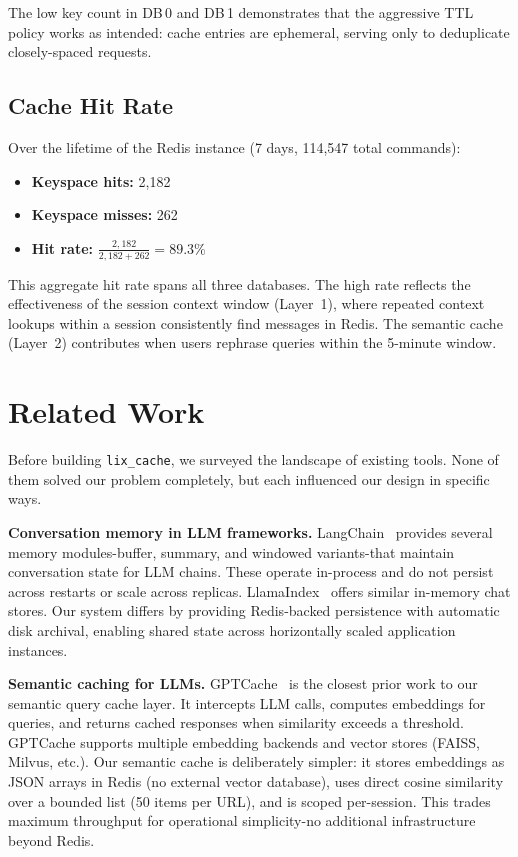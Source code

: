 \documentclass[conference]{IEEEtran}
\begin{document}
The low key count in DB\,0 and DB\,1 demonstrates that the aggressive TTL policy works as intended: cache entries are ephemeral, serving only to deduplicate closely-spaced requests.

\subsection{Cache Hit Rate}

Over the lifetime of the Redis instance (7 days, 114{,}547 total commands):

\begin{itemize}
\item \textbf{Keyspace hits:} 2{,}182
\item \textbf{Keyspace misses:} 262
\item \textbf{Hit rate:} $\frac{2{,}182}{2{,}182 + 262} = \mathbf{89.3\%}$
\end{itemize}

This aggregate hit rate spans all three databases. The high rate reflects the effectiveness of the session context window (Layer~1), where repeated context lookups within a session consistently find messages in Redis. The semantic cache (Layer~2) contributes when users rephrase queries within the 5-minute window.

\section{Related Work}
\label{sec:related}

Before building \texttt{lix\_cache}, we surveyed the landscape of existing tools. None of them solved our problem completely, but each influenced our design in specific ways.

\textbf{Conversation memory in LLM frameworks.}
LangChain~\cite{langchain2023} provides several memory modules-buffer, summary, and windowed variants-that maintain conversation state for LLM chains. These operate in-process and do not persist across restarts or scale across replicas. LlamaIndex~\cite{llamaindex2023} offers similar in-memory chat stores. Our system differs by providing Redis-backed persistence with automatic disk archival, enabling shared state across horizontally scaled application instances.

\textbf{Semantic caching for LLMs.}
GPTCache~\cite{gptcache2023} is the closest prior work to our semantic query cache layer. It intercepts LLM calls, computes embeddings for queries, and returns cached responses when similarity exceeds a threshold. GPTCache supports multiple embedding backends and vector stores (FAISS, Milvus, etc.). Our semantic cache is deliberately simpler: it stores embeddings as JSON arrays in Redis (no external vector database), uses direct cosine similarity over a bounded list (50 items per URL), and is scoped per-session. This trades maximum throughput for operational simplicity-no additional infrastructure beyond Redis.
\end{document}
